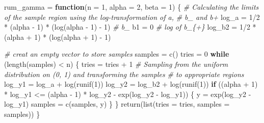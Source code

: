 \documentclass[
]{article}
\newenvironment{Shaded}{\begin{snugshade}}{\end{snugshade}}
\newcommand{\AttributeTok}[1]{\textcolor[rgb]{0.77,0.63,0.00}{#1}}
\newcommand{\CommentTok}[1]{\textcolor[rgb]{0.56,0.35,0.01}{\textit{#1}}}
\newcommand{\ControlFlowTok}[1]{\textcolor[rgb]{0.13,0.29,0.53}{\textbf{#1}}}
\newcommand{\DecValTok}[1]{\textcolor[rgb]{0.00,0.00,0.81}{#1}}
\newcommand{\FunctionTok}[1]{\textcolor[rgb]{0.00,0.00,0.00}{#1}}
\newcommand{\NormalTok}[1]{#1}
\newcommand{\OtherTok}[1]{\textcolor[rgb]{0.56,0.35,0.01}{#1}}
\newcommand{\SpecialCharTok}[1]{\textcolor[rgb]{0.00,0.00,0.00}{#1}}
\begin{document}
\begin{Shaded}
\begin{Highlighting}[]
\NormalTok{rum\_gamma }\OtherTok{=} \ControlFlowTok{function}\NormalTok{(}\AttributeTok{n =} \DecValTok{1}\NormalTok{, }\AttributeTok{alpha =} \DecValTok{2}\NormalTok{, }\AttributeTok{beta =} \DecValTok{1}\NormalTok{) \{}
    \CommentTok{\# Calculating the limits of the sample region using the log{-}transformation of a,}
    \CommentTok{\# b\_ and b+}
\NormalTok{    log\_a }\OtherTok{=} \DecValTok{1}\SpecialCharTok{/}\DecValTok{2} \SpecialCharTok{*}\NormalTok{ (alpha }\SpecialCharTok{{-}} \DecValTok{1}\NormalTok{) }\SpecialCharTok{*}\NormalTok{ (}\FunctionTok{log}\NormalTok{(alpha }\SpecialCharTok{{-}} \DecValTok{1}\NormalTok{) }\SpecialCharTok{{-}} \DecValTok{1}\NormalTok{)}
    \CommentTok{\# b\_}
\NormalTok{    b1 }\OtherTok{=} \DecValTok{0}
    \CommentTok{\# log of b\_\{+\}}
\NormalTok{    log\_b2 }\OtherTok{=} \DecValTok{1}\SpecialCharTok{/}\DecValTok{2} \SpecialCharTok{*}\NormalTok{ (alpha }\SpecialCharTok{+} \DecValTok{1}\NormalTok{) }\SpecialCharTok{*}\NormalTok{ (}\FunctionTok{log}\NormalTok{(alpha }\SpecialCharTok{+} \DecValTok{1}\NormalTok{) }\SpecialCharTok{{-}} \DecValTok{1}\NormalTok{)}
    
    \CommentTok{\# creat an empty vector to store samples}
\NormalTok{    samples }\OtherTok{=} \FunctionTok{c}\NormalTok{()}
\NormalTok{    tries }\OtherTok{=} \DecValTok{0}
    \ControlFlowTok{while}\NormalTok{ (}\FunctionTok{length}\NormalTok{(samples) }\SpecialCharTok{\textless{}}\NormalTok{ n) \{}
\NormalTok{        tries }\OtherTok{=}\NormalTok{ tries }\SpecialCharTok{+} \DecValTok{1}
        \CommentTok{\# Sampling from the uniform distribution on (0, 1) and transforming the samples}
        \CommentTok{\# to appropriate regions}
\NormalTok{        log\_y1 }\OtherTok{=}\NormalTok{ log\_a }\SpecialCharTok{+} \FunctionTok{log}\NormalTok{(}\FunctionTok{runif}\NormalTok{(}\DecValTok{1}\NormalTok{))}
\NormalTok{        log\_y2 }\OtherTok{=}\NormalTok{ log\_b2 }\SpecialCharTok{+} \FunctionTok{log}\NormalTok{(}\FunctionTok{runif}\NormalTok{(}\DecValTok{1}\NormalTok{))}
        \ControlFlowTok{if}\NormalTok{ ((alpha }\SpecialCharTok{+} \DecValTok{1}\NormalTok{) }\SpecialCharTok{*}\NormalTok{ log\_y1 }\SpecialCharTok{\textless{}=}\NormalTok{ (alpha }\SpecialCharTok{{-}} \DecValTok{1}\NormalTok{) }\SpecialCharTok{*}\NormalTok{ log\_y2 }\SpecialCharTok{{-}} \FunctionTok{exp}\NormalTok{(log\_y2 }\SpecialCharTok{{-}}\NormalTok{ log\_y1)) \{}
\NormalTok{            y }\OtherTok{=} \FunctionTok{exp}\NormalTok{(log\_y2 }\SpecialCharTok{{-}}\NormalTok{ log\_y1)}
\NormalTok{            samples }\OtherTok{=} \FunctionTok{c}\NormalTok{(samples, y)}
\NormalTok{        \}}
\NormalTok{    \}}
    \FunctionTok{return}\NormalTok{(}\FunctionTok{list}\NormalTok{(}\AttributeTok{tries =}\NormalTok{ tries, }\AttributeTok{samples =}\NormalTok{ samples))}
\NormalTok{\}}
\end{Highlighting}
\end{Shaded}
\end{document}
